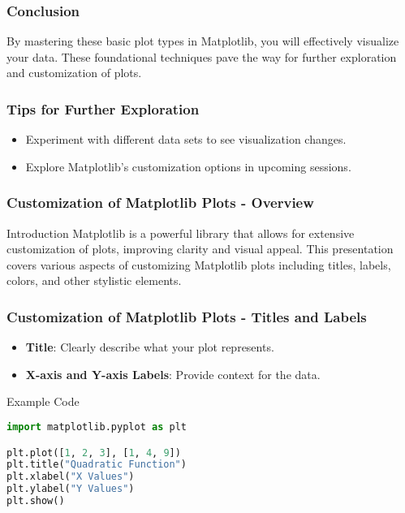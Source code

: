 \documentclass[aspectratio=169]{beamer}
\begin{document}
\begin{frame}
    \frametitle{Conclusion}
    By mastering these basic plot types in Matplotlib, you will effectively visualize your data. These foundational techniques pave the way for further exploration and customization of plots.
\end{frame}

\begin{frame}
    \frametitle{Tips for Further Exploration}
    \begin{itemize}
        \item Experiment with different data sets to see visualization changes.
        \item Explore Matplotlib's customization options in upcoming sessions.
    \end{itemize}
\end{frame}

\begin{frame}[fragile]
    \frametitle{Customization of Matplotlib Plots - Overview}
    \begin{block}{Introduction}
        Matplotlib is a powerful library that allows for extensive customization of plots, improving clarity and visual appeal. This presentation covers various aspects of customizing Matplotlib plots including titles, labels, colors, and other stylistic elements.
    \end{block}
\end{frame}

\begin{frame}[fragile]
    \frametitle{Customization of Matplotlib Plots - Titles and Labels}
    \begin{itemize}
        \item \textbf{Title}: Clearly describe what your plot represents.
        \item \textbf{X-axis and Y-axis Labels}: Provide context for the data.
    \end{itemize}
    \begin{block}{Example Code}
    \begin{lstlisting}[language=Python]
import matplotlib.pyplot as plt

plt.plot([1, 2, 3], [1, 4, 9])
plt.title("Quadratic Function")
plt.xlabel("X Values")
plt.ylabel("Y Values")
plt.show()
    \end{lstlisting}
    \end{block}
\end{frame}
\end{document}

